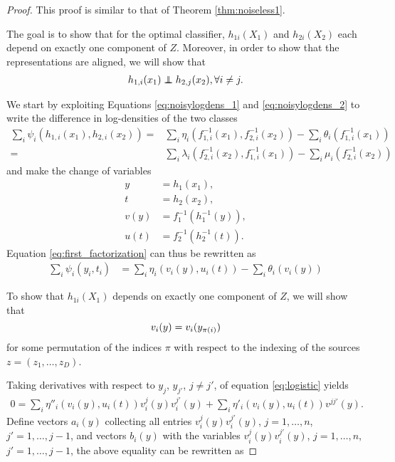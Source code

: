\begin{proof}
This proof is similar to that of Theorem \ref{thm:noiseless1}.

The goal is to show that for the optimal classifier, $h_{1i}(X_1)$ and $h_{2i}(X_2)$ each depend on exactly one component of $Z$. 
Moreover, in order to show that the representations are aligned, we will show that 
	\begin{align}
	h_{1,i}({x}_{1})\independent h_{2,j}({x}_{2}),\forall i\neq j. \label{eq:inds_twov_3}
	\end{align}
	
	We start by exploiting Equations \ref{eq:noisylogdens_1} and \ref{eq:noisylogdens_2} to write the difference in log-densities of the two classes
	\begin{align}
	\sum_{i}\psi_{i}(h_{1,i}({x}_{1}),h_{2,i}({x}_{2}))
	=&\sum_{i}\eta_{i}({f}_{1,i}^{-1}({x}_{1}), {f}_{2,i}^{-1}({x}_{2})) - \sum_{i}\theta_{i}({f}_{1,i}^{-1}({x}_{1})) \label{eq:first_factorization}\\
	=&\sum_{i}\lambda_{i}({f}_{2,i}^{-1}({x}_{2}), {f}_{1,i}^{-1}({x}_{1})) - \sum_{i}\mu_{i}({f}_{2,i}^{-1}({x}_{2}))\label{eq:2nd_factorization}
	\end{align}
	and make the change of variables
	\begin{align*}
	{y} & ={h}_1({x}_{1}),\\
	{t} & ={h}_2({x}_{2}),\\
	{v}({y}) & ={f}_{1}^{-1}({h}_1^{-1}({y})),\\
	{u}({t}) & ={f}_{2}^{-1}({h}_2^{-1}({t})).
	\end{align*}
	Equation \ref{eq:first_factorization} can thus be rewritten as
	\begin{align}
	\sum_{i}\psi_{i}(y_{i},t_{i}) 
	&=\sum_{i}\eta_{i}(v_i({y}), u_i({t}))
	-\sum_{i}\theta_{i}(v_i({y}))\label{eq:logistic}
	\end{align}

	To show that $h_{1i}(X_1)$ depends on exactly one component of $Z$, we will show that
	\begin{equation}
	\label{eq:v_onev}
	v_{i}({y})  = v_{i}(y_{\pi(i)})\\
	\end{equation}
	for some permutation of the indices $\pi$ with respect to the indexing of the sources ${z} = (z_1, \ldots, z_D)$.
	
	Taking derivatives with respect to $y_j$, $y_{j'}$, $j \neq j'$,  of equation \ref{eq:logistic} yields
	\begin{align*}
	0 = \sum_{i} \eta''_{i}(v_{i}({y}),u_{i}({t}))v^j_i({y})v^{j'}_i({y}) + \sum_{i}\eta'_{i}(v_{i}({y}), u_{i}({t}))v^{jj'}({y}).
	\end{align*}
	Define vectors ${a}_i({y})$ collecting all entries $v_i^j({y})v_i^{j'}({y})$, $j=1, \ldots, n$, $j'=1, \ldots, j-1$, and vectors ${b}_i({y})$ with the variables $v_i^j({y})v_i^{j'}({y})$, $j=1, \ldots, n$, $j'=1, \ldots, j-1$, the above equality can be rewritten as
	

\end{proof}
